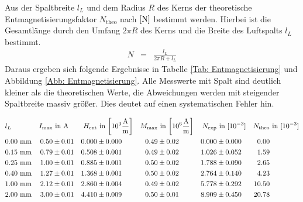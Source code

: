 \documentclass[12pt,a4paper]{scrartcl}
\numberwithin{equation}{section} %
\renewcommand{\[}{} %
\renewcommand{\]}{\noindent} %
\begin{document}
Aus der Spaltbreite \(l_L\) und dem Radius \(R\) des Kerns der theoretische Entmagnetisierungsfaktor \(N_\mathrm{theo}\) nach \(\eqref{N}\) bestimmt werden. Hierbei ist die Gesamtlänge durch den Umfang \(2\pi R\) des Kerns und die Breite des Luftspalts \(l_L\)
bestimmt.
\begin{eqnarray}
    N &=& \frac{l_L}{2\pi R + l_L} 
\end{eqnarray}
Daraus ergeben sich folgende Ergebnisse in Tabelle \ref{Tab: Entmagnetisierung} und Abbildung \ref{Abb: Entmagnetisierung}. Alle Messwerte mit Spalt sind deutlich kleiner als die theoretischen Werte, die Abweichungen werden mit steigender Spaltbreite massiv größer. Dies deutet auf einen systematischen Fehler hin.

\begin{table}
\begin{align*}
	&l_L &
	I_\mathrm{max} &\text{ in } \mathrm A &
	H_\mathrm{ent} &\text{ in }
	{\tiny \left[ 10^3 \frac{\mathrm A}{\mathrm m} \right] } &
	M_\mathrm{max} &\text{ in }
	{\tiny \left[ 10^6 \frac{\mathrm A}{\mathrm m} \right] } &
	N_\mathrm{exp} &\text{ in } [10^{-3}] &
	N_\mathrm{theo} &\text{ in } [10^{-3}]
	\\
	&0.00 \ \mathrm{mm} &
	0.50 &\pm 0.01 &
	0.000 &\pm 0.000 &
	0.49 &\pm 0.02 &
	0.000 &\pm 0.000 &
	0.00\\
	&0.15 \ \mathrm{mm} &
	0.79 &\pm 0.01 &
	0.508 &\pm 0.001 &
	0.49 &\pm 0.02 &
	1.026 &\pm 0.052 &
	1.59\\
	&0.25 \ \mathrm{mm} &
	1.00 &\pm 0.01 &
	0.885 &\pm 0.001 &
	0.50 &\pm 0.02 &
	1.788 &\pm 0.090 &
	2.65\\
	&0.40 \ \mathrm{mm} &
	1.27 &\pm 0.01 &
	1.368 &\pm 0.001 &
	0.50 &\pm 0.02 &
	2.764 &\pm 0.140 &
	4.23\\
	&1.00 \ \mathrm{mm} &
	2.12 &\pm 0.01 &
	2.860 &\pm 0.004 &
	0.49 &\pm 0.02 &
	5.778 &\pm 0.292 &
	10.50\\
	&2.00 \ \mathrm{mm} &
	3.00 &\pm 0.01 &
	4.410 &\pm 0.009 &
	0.50 &\pm 0.01 &
	8.909 &\pm 0.450 &
	20.78
\end{align*}
\caption{Entmagnetisierungsfaktor}
\label{Tab: Entmagnetisierung}
\end{table}
\end{document}

